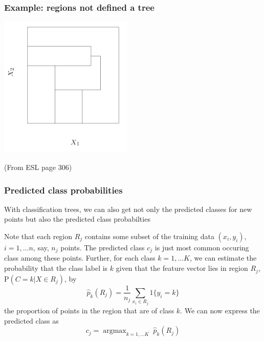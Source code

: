 \documentclass[mathserif]{beamer}
\newcommand{\argmax}{\mathop{\mathrm{argmax}}}
\def\P{\mathrm{P}}
\def\red{\color[rgb]{0.8,0,0}}
\begin{document}
\begin{frame}
\frametitle{Example: regions not defined a tree}
\begin{center}
\bigskip
\includegraphics[width=2.5in]{ex1-notpos.png}
\end{center}
\vspace{-5pt}
(From ESL page 306)
\end{frame}

\begin{frame}
\frametitle{Predicted class probabilities}
\smallskip
\smallskip
With classification trees, we can also get not only the predicted
classes for new points but also the {\red predicted class probabilties}

\bigskip
Note that each region $R_j$ contains some subset of the training data
$(x_i,y_i)$, $i=1,\ldots n$, say, $n_j$ points. The predicted class $c_j$ is 
just most common occuring class among these points. Further, for each class
$k=1,\ldots K$, we can estimate the probability that the class label is $k$
given that the feature vector lies in region $R_j$, $\P(C=k|X\in R_j)$, by
$$\hat{p}_k (R_j) = \frac{1}{n_j}\sum_{x_i \in R_j} 1\{y_i = k\}$$
the {\red proportion of points} in the region that are of class $k$. 
We can now express the predicted class as
$$c_j = \argmax_{k=1,\ldots K} \; \hat{p}_k (R_j)$$
\end{frame}
\end{document}
